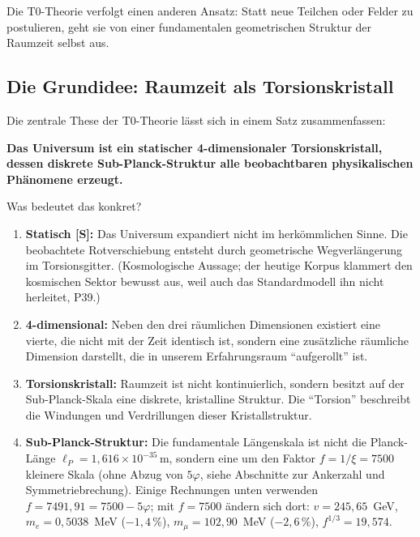 	Die T0-Theorie verfolgt einen anderen Ansatz: Statt neue Teilchen oder Felder zu postulieren, geht sie von einer fundamentalen geometrischen Struktur der Raumzeit selbst aus.
	
	\subsection{Die Grundidee: Raumzeit als Torsionskristall}
	
	Die zentrale These der T0-Theorie lässt sich in einem Satz zusammenfassen:
	
	\begin{center}
		\textbf{Das Universum ist ein statischer 4-dimensionaler Torsionskristall, dessen diskrete Sub-Planck-Struktur alle beobachtbaren physikalischen Phänomene erzeugt.}
	\end{center}
	
	Was bedeutet das konkret?
	
	\begin{enumerate}
		\item \textbf{Statisch \textbf{[S]}:} Das Universum expandiert nicht im herkömmlichen Sinne. Die beobachtete Rotverschiebung entsteht durch geometrische Wegverlängerung im Torsionsgitter. (Kosmologische Aussage; der heutige Korpus klammert den kosmischen Sektor bewusst aus, weil auch das Standardmodell ihn nicht herleitet, P39.)
		\item \textbf{4-dimensional:} Neben den drei räumlichen Dimensionen existiert eine vierte, die nicht mit der Zeit identisch ist, sondern eine zusätzliche räumliche Dimension darstellt, die in unserem Erfahrungsraum \enquote{aufgerollt} ist.
		\item \textbf{Torsionskristall:} Raumzeit ist nicht kontinuierlich, sondern besitzt auf der Sub-Planck-Skala eine diskrete, kristalline Struktur. Die \enquote{Torsion} beschreibt die Windungen und Verdrillungen dieser Kristallstruktur.
		\item \textbf{Sub-Planck-Struktur:} Die fundamentale Längenskala ist nicht die Planck-Länge \(\ell_P = 1{,}616 \times 10^{-35}\,\text{m}\), sondern eine um den Faktor \(f = 1/\xi = 7500\) kleinere Skala (ohne Abzug von $5\varphi$, siehe Abschnitte zur Ankerzahl und Symmetriebrechung). Einige Rechnungen unten verwenden $f = 7491{,}91 = 7500 - 5\varphi$; mit $f = 7500$ ändern sich dort: $v = 245{,}65$~GeV, $m_e = 0{,}5038$~MeV ($-1{,}4\,\%$), $m_\mu = 102{,}90$~MeV ($-2{,}6\,\%$), $f^{1/3} = 19{,}574$.
	\end{enumerate}
	
